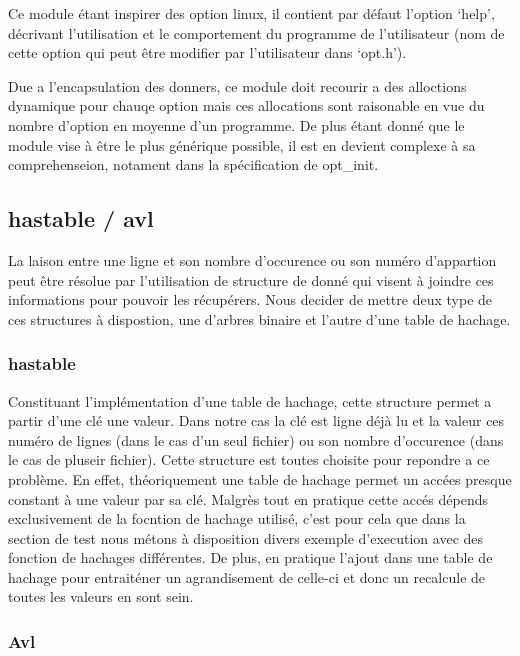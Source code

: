 \documentclass[12pt]{article}
\begin{document}
        Ce module étant inspirer des option linux, il contient par défaut 
        l'option `help', décrivant l'utilisation et le comportement du 
        programme de l'utilisateur (nom de cette option qui peut être modifier 
        par l'utilisateur dans `opt.h'). 

        Due a l'encapsulation des donners, ce module doit recourir a des 
        alloctions dynamique pour chauqe option mais ces allocations sont 
        raisonable en vue du nombre d'option en moyenne d'un programme. De plus
         étant donné que le module vise à être le plus générique possible, il
          est en devient complexe à sa comprehenseion, notament dans la 
          spécification de opt\_init. 

    \subsection{hastable / avl}

    La laison entre une ligne et son nombre d'occurence ou son numéro d'appartion peut être résolue par l'utilisation de structure de donné qui visent à joindre ces informations pour pouvoir les récupérers. Nous decider de mettre deux type de ces structures à dispostion, une d'arbres binaire et l'autre d'une table de hachage. 

    \subsubsection{hastable}

    Constituant l'implémentation d'une table de hachage, cette structure permet a partir d'une clé une valeur. Dans notre cas la clé est ligne déjà lu et la valeur ces numéro de lignes (dans le cas d'un seul fichier) ou son nombre d'occurence (dans le cas de pluseir fichier). Cette structure est toutes choisite pour repondre a ce problème. En effet, théoriquement une table de hachage permet un accées presque constant à une valeur par sa clé. Malgrès tout en pratique cette accés dépends exclusivement de la focntion de hachage utilisé, c'est pour cela que dans la section de test nous métons à disposition divers exemple d'execution avec des fonction de hachages différentes. De plus, en pratique l'ajout dans une table de hachage pour entraiténer un agrandisement de celle-ci et donc un recalcule de toutes les valeurs en sont sein.  

    \subsubsection{Avl}
\end{document}
